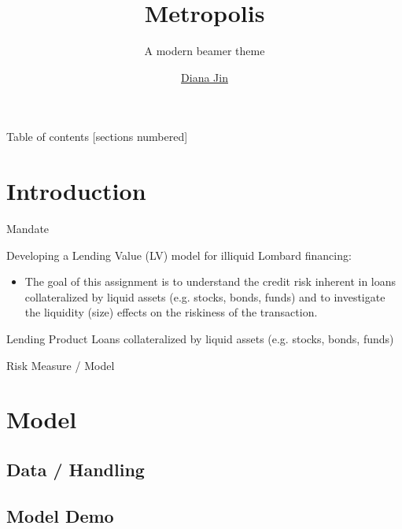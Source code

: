 \documentclass[compress, 10pt]{beamer}
\title{Metropolis}
\subtitle{A modern beamer theme}
\date{}
\author{\href{mailto:diana.jin@uzh.ch}{Diana Jin}}
\institute{Applied Credit Risk Modeling}
\begin{document}
\maketitle

\begin{frame}{Table of contents}
  [sections numbered]
  \tableofcontents%
\end{frame}
\section[Intro]{Introduction}

\begin{frame}[fragile]{Mandate}

    Developing a Lending Value (LV) model for illiquid Lombard financing:
    \begin{itemize}
        \item The goal of this assignment is to understand the credit risk inherent in loans collateralized by liquid assets (e.g. stocks, bonds, funds) and to investigate the liquidity (size) effects on the riskiness of the transaction.
    \end{itemize}


\end{frame}

\begin{frame}[fragile]{Lending Product}
    Loans collateralized by liquid assets (e.g. stocks, bonds, funds)
\end{frame}

\begin{frame}[fragile]{Risk Measure / Model}
    
\end{frame}
\section{Model}

\subsection{Data / Handling}

\subsection{Model Demo}
\end{document}
